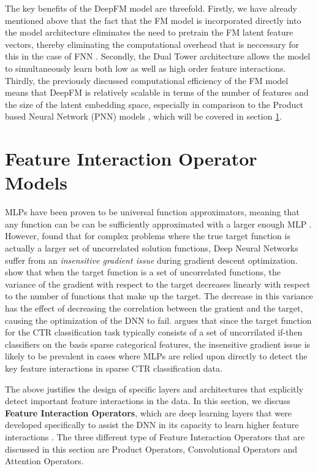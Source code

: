 \documentclass{mldsmsc}
\begin{document}
The key benefits of the DeepFM model are threefold. Firstly, we have already mentioned above
that the fact that the FM model is incorporated directly into the model architecture eliminates
the need to pretrain the FM latent feature vectors, thereby eliminating the computational overhead
that is neccessary for this in the case of FNN \citep{RefWorks:zhang2016deep}. Secondly,
the Dual Tower architecture allows the model to simultaneously learn both low as well as high
order feature interactions. Thirdly, the previously discussed computational efficiency of the
FM model means that DeepFM is relatively scalable in terms of the number of features and the size of
the latent embedding space, especially in comparison to the Product based Neural Network
(PNN) models \citep{RefWorks:qu2016product-based}, which will be covered in section \ref{sec:feature-operator-models}.

\section{Feature Interaction Operator Models}
\label{sec:feature-operator-models}

MLPs have been proven to be universal function approximators, meaning that any function can be
can be sufficiently approximated with a larger enough MLP \citep{RefWorks:hornik1989multilayer,RefWorks:cybenko1989approximation,RefWorks:hornik1990universal}.
However, \cite{RefWorks:shalev-shwartz2017failures} found that for complex problems where the true target function
is actually a larger set of uncorrelated solution functions, Deep Neural Networks suffer from
an \emph{insensitive gradient issue} during gradient descent optimization. \cite{RefWorks:shalev-shwartz2017failures}
show that when the target function is a set of uncorrelated functions, the variance of the gradient
with respect to the target decreases linearly with respect to the number of functions that make up the target.
The decrease in this variance has the effect of decreasing the correlation between the gratient
and the target, causing the optimization of the DNN to fail. \cite{RefWorks:qu2018product-based}
argues that since the target function for the CTR classification task typically consists of a
set of uncorrilated if-then classifiers on the basis sparse categorical features, the insensitive
gradient issue is likely to be prevalent in cases where MLPs are relied upon directly
to detect the key feature interactions in sparse CTR classification data.

The above justifies the design of specific layers and architectures that explicitly detect important
feature interactions in the data. In this section, we discuss \textbf{Feature Interaction Operators},
which are deep learning layers that were developed specifically to assist the DNN in its capacity
to learn higher feature interactions \citep{RefWorks:zhang2021deep}. The three different type of Feature Interaction
Operators that are discussed in this section are Product Operators, Convolutional Operators
and Attention Operators.
\end{document}
